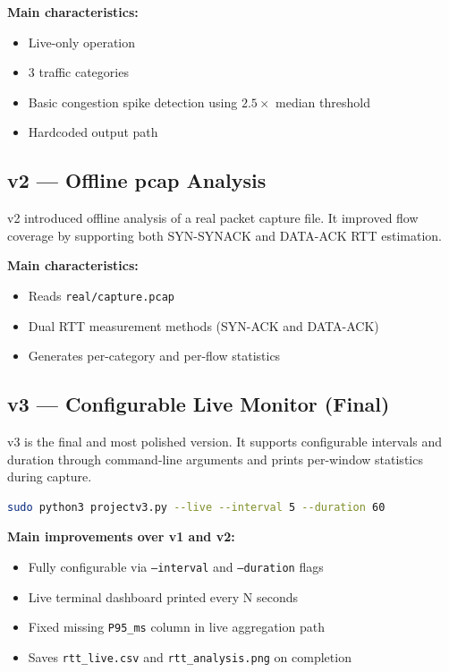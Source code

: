 \documentclass[12pt,a4paper]{article}
\begin{document}
\textbf{Main characteristics:}
\begin{itemize}[leftmargin=*]
    \item Live-only operation
    \item 3 traffic categories
    \item Basic congestion spike detection using $2.5\times$ median threshold
    \item Hardcoded output path
\end{itemize}

\subsection{v2 --- Offline pcap Analysis}

v2 introduced offline analysis of a real packet capture file. It improved flow
coverage by supporting both SYN-SYNACK and DATA-ACK RTT estimation.

\textbf{Main characteristics:}
\begin{itemize}[leftmargin=*]
    \item Reads \texttt{real/capture.pcap}
    \item Dual RTT measurement methods (SYN-ACK and DATA-ACK)
    \item Generates per-category and per-flow statistics
\end{itemize}

\subsection{v3 --- Configurable Live Monitor (Final)}

v3 is the final and most polished version. It supports configurable intervals
and duration through command-line arguments and prints per-window statistics
during capture.

\begin{lstlisting}[language=bash, caption={Example v3 command}]
sudo python3 projectv3.py --live --interval 5 --duration 60
\end{lstlisting}

\textbf{Main improvements over v1 and v2:}
\begin{itemize}[leftmargin=*]
    \item Fully configurable via \texttt{--interval} and \texttt{--duration} flags
    \item Live terminal dashboard printed every N seconds
    \item Fixed missing \texttt{P95\_ms} column in live aggregation path
    \item Saves \texttt{rtt\_live.csv} and \texttt{rtt\_analysis.png} on completion
\end{itemize}
\end{document}
